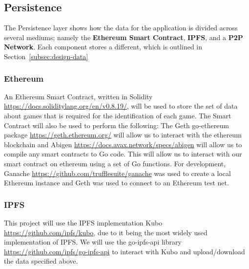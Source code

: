 
\subsection{Persistence}

The Persistence layer shows how the data for the application is divided across several mediums; namely the \textbf{Ethereum Smart Contract}, \textbf{IPFS}, and a \textbf{P2P Network}. Each component stores a different, which is outlined in Section~\ref{subsec:design-data}

\subsubsection{Ethereum}\label{subsubsec:impl-eth}

An Ethereum Smart Contract, written in Solidity \url{https://docs.soliditylang.org/en/v0.8.19/}, will be used to store the set of data about games that is required for the identification of each game. The Smart Contract will also be used to perform the following:
\x
The Geth go-ethereum package \url{https://geth.ethereum.org/} will allow us to interact with the ethereum blockchain and Abigen \url{https://docs.avax.network/specs/abigen} will allow us to compile any smart contracts to Go code. This will allow us to interact with our smart contract on ethereum using a set of Go functions. For development, Ganache \url{https://github.com/trufflesuite/ganache} was used to create a local Ethereum instance and Geth was used to connect to an Ethereum test net.


\subsubsection{IPFS}

This project will use the IPFS implementation Kubo \url{https://github.com/ipfs/kubo}, due to it being the most widely used implementation of IPFS. We will use the go-ipfs-api library \url{https://github.com/ipfs/go-ipfs-api} to interact with Kubo and upload/download the data specified above.

